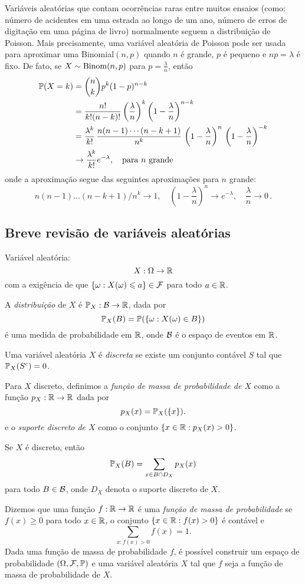 Variáveis aleatórias que contam ocorrências raras entre muitos ensaios (como: número de acidentes em uma estrada ao longo de um ano, número de erros de digitação em uma página de livro) normalmente seguem a distribuição de Poisson.
Mais precisamente, uma variável aleatória de Poisson pode ser usada para aproximar uma Binomial$(n,p)$ quando $n$ é grande, $p$ é pequeno e $np= \lambda$ é fixo.
De fato, se $X \sim \mathrm{Binom} (n,p)$ para
$ p = \frac{\lambda}{n} $, então
\begin{align}
\mathbb{P}(X=k) &= { n \choose k} p^k (1-p)^{n-k} \\
&= \frac{n!}{k!(n-k)!} \left( \frac{\lambda}{n} \right)^k\left(1-\frac{\lambda}{n} \right)^{n-k} \\
&= \frac{\lambda^k}{k!}
\,
\frac{n(n-1) \cdots (n-k+1)}{n^k}
\,
\left(1-\frac{\lambda}{n} \right)^{n}
\,
\left(1-\frac{\lambda}{n} \right)^{-k} \\
&\to \frac{\lambda^k}{k!}e^{-\lambda}, \quad \text{para } n \text{ grande}
\end{align}
onde a aproximação segue das seguintes aproximações para $n$ grande:
\begin{equation}
n(n-1)...(n-k+1)/n^k \to 1, \quad \left(1-\frac{\lambda}{n} \right)^{n} \to e^{-\lambda}, \quad \frac{\lambda}{n} \to 0 \,.
\end{equation}

\subsection*{Breve revisão de variáveis aleatórias}

Variável aleatória:
\[
X : \Omega \to \mathbb{R}
\]
com a exigência de que $ \{\omega:X(\omega) \leqslant a\} \in \mathcal F $ para todo $ a \in \mathbb{R} $.

A \emph{distribuição} de $ X $ é $ \mathbb{P}_X : \mathcal B \to \mathbb{R} $, dada por
\[
\mathbb{P}_X(B) = \mathbb{P}(\{\omega:X(\omega)\in B\})
\]
é uma medida de probabilidade em $ \mathbb{R} $, onde $ \mathcal B $ é o espaço de eventos em $ \mathbb{R} $.

Uma variável aleatória $ X $ é \emph{discreta} se existe um conjunto contável $ S $ tal que $ \mathbb{P}_X(S^c)=0 $.

Para $ X $ discreto, definimos a \emph{função de massa de probabilidade de $ X $} como a função $ p_X : \mathbb{R} \to \mathbb{R} $ dada por
\[
p_X(x) = \mathbb{P}_X(\{x\}).
\]
e o \emph{suporte discreto de $ X $} como o conjunto $ \{x \in \mathbb{R}: p_X(x)>0\} $.

Se $ X $ é discreto, então
\[
\mathbb{P}_X(B) = \sum_{x \in B \cap D_X} p_X(x)
\]
para todo $ B \in \mathcal B $, onde $ D_X $ denota o suporte discreto de $ X $.

Dizemos que uma função $ f:\mathbb{R} \to \mathbb{R} $ é uma \emph{função de massa de probabilidade} se $ f(x) \geq 0 $ para todo $ x\in\mathbb{R} $, o conjunto $ \{x\in\mathbb{R}:f(x)>0\} $ é contável e
$$ \sum_{x:f(x)>0} f(x) = 1. $$
Dada uma função de massa de probabilidade $ f $, é possível construir um espaço de probabilidade $ (\Omega,\mathcal F,\mathbb{P}) $ e uma variável aleatória $ X $ tal que $ f $ seja a função de massa de probabilidade de $ X $.
